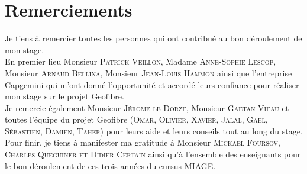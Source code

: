 \chapter*{Remerciements}
\begin{flushright}
Je tiens à remercier toutes les personnes qui ont contribué au bon déroulement de mon stage.
\\[1cm]En premier lieu Monsieur \textsc{Patrick Veillon}, Madame \textsc{Anne-Sophie Lescop}, Monsieur \textsc{Arnaud Bellina}, Monsieur \textsc{Jean-Louis Hammon} ainsi que l'entreprise Capgemini
qui m'ont donné l'opportunité et accordé leurs confiance pour réaliser mon stage sur le projet Geofibre.
\\[1cm]Je remercie également Monsieur \textsc{Jérome le Dorze}, Monsieur \textsc{Gaëtan Vieau} et toutes l'équipe du projet Geofibre (\textsc{Omar, Olivier, Xavier, Jalal, Gaël, Sébastien, Damien, Taher}) pour leurs aide et leurs conseils tout au long du stage.
\\[1cm]Pour finir, je tiens à manifester ma gratitude à Monsieur \textsc{Mickaël Foursov, Charles Queguiner et Didier Certain} ainsi qu'à l'ensemble des enseignants pour le bon déroulement de ces trois années du cursus MIAGE.
\end{flushright}
